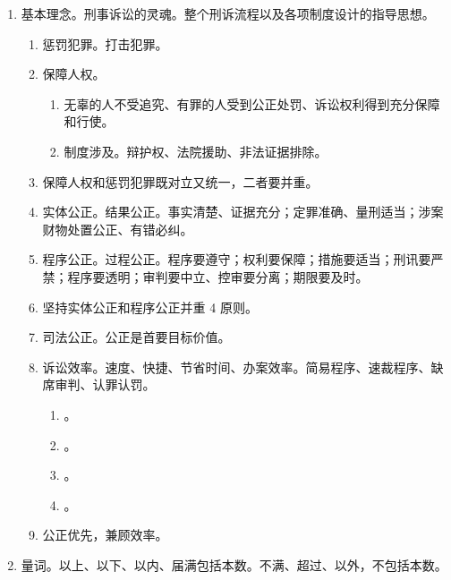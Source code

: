 \begin{enumerate}
  \item 基本理念。刑事诉讼的灵魂。整个刑诉流程以及各项制度设计的指导思想。
        \begin{enumerate}
          \item 惩罚犯罪。打击犯罪。
          \item 保障人权。
                \begin{enumerate}
                  \item 无辜的人不受追究、有罪的人受到公正处罚、诉讼权利得到充分保障和行使。
                  \item 制度涉及。辩护权、法院援助、非法证据排除。
                \end{enumerate}
          \item 保障人权和惩罚犯罪既对立又统一，二者要并重。
          \item 实体公正。结果公正。事实清楚、证据充分；定罪准确、量刑适当；涉案财物处置公正、有错必纠。
          \item 程序公正。过程公正。程序要遵守；权利要保障；措施要适当；刑讯要严禁；程序要透明；审判要中立、控审要分离；期限要及时。
          \item 坚持实体公正和程序公正并重 4 原则。
          \item 司法公正。公正是首要目标价值。
          \item 诉讼效率。速度、快捷、节省时间、办案效率。简易程序、速裁程序、缺席审判、认罪认罚。
                \begin{enumerate}
                  \item {}。
                  \item {}。
                  \item {}。
                  \item {}。
                \end{enumerate}
          \item 公正优先，兼顾效率。
        \end{enumerate}
  \item 量词。以上、以下、以内、届满包括本数。不满、超过、以外，不包括本数。
\end{enumerate}
